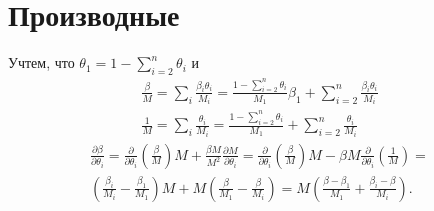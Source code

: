 \documentclass[12pt]{article}
\newcommand{\pd}[2]{\frac{\partial #1}{\partial #2}}
\begin{document}
\section{Производные}
Учтем, что $\theta_1 = 1 - \sum_{i = 2}^n \theta_i$ и 
\begin{gather*}
\frac{\beta}{M} = \sum_i \frac{\beta_i\theta_i}{M_i} = 
\frac{1 - \sum_{i=2}^n \theta_i}{M_1}\beta_1
+\sum_{i=2}^n \frac{\beta_i\theta_i}{M_i}\\
\frac{1}{M} = \sum_i \frac{\theta_i}{M_i} = 
\frac{1 - \sum_{i=2}^n \theta_i}{M_1}
+\sum_{i=2}^n \frac{\theta_i}{M_i}
\end{gather*}
\begin{multline*}
\pd{\beta}{\theta_i} = 
\pd{}{\theta_i}\left(\frac{\beta}{M}\right)M
+\frac{\beta M}{M^2} \pd{M}{\theta_i} =
\pd{}{\theta_i}\left(\frac{\beta}{M}\right)M
-\beta M \pd{}{\theta_i}\left(\frac{1}{M}\right) = \\
\left(\frac{\beta_i}{M_i}-\frac{\beta_1}{M_1}\right)M + 
M \left(\frac{\beta}{M_1} - \frac{\beta}{M_i}\right) = 
M \left(\frac{\beta - \beta_1}{M_1} + \frac{\beta_i - \beta}{M_i}\right).
\end{multline*}
\end{document}

